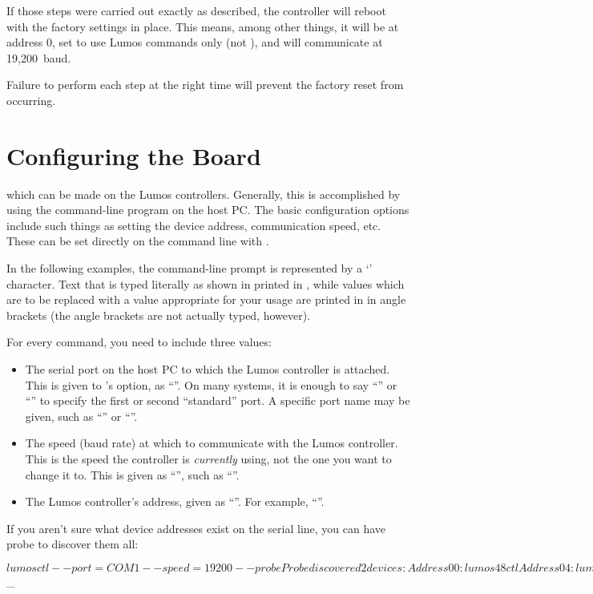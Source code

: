 \documentclass[letterpaper,twoside,onecolumn,openright,final]{memoir}
\begin{document}
If those steps were carried out exactly as described, %
the controller will reboot with the factory settings in place.  This means, among other things,
it will be at address 0, set to use Lumos commands only (not ), and will communicate
at 19,200~baud.

Failure to perform each step at the right time will prevent the factory reset from occurring.

\chapter{Configuring the Board}
 which can be made on the Lumos controllers.  Generally,
this is accomplished by using the  com\-mand-line program on the host PC.  The basic configuration
options include such things as setting the device address, communication speed, etc.  These can be set
directly on the command line with .

In the following examples, the command-line prompt is represented by a `\z{\$}' character.
Text that is typed literally as shown in printed in , while values which are
to be replaced with a value appropriate for your usage are printed in  in angle brackets
(the angle brackets are not actually typed, however).

For every command, you need to include three values:
\begin{itemize}
	\item 	The serial port on the host PC to which the Lumos controller is attached.  This is
		given to 's  option, as ``''.  On many
		systems, it is enough to say ``'' or ``'' to specify the first
		or second ``standard'' port.  A specific port name may be given, such as 
		``'' or ``''.
	\item	The speed (baud rate) at which to communicate with the Lumos controller.  This is
		the speed the controller is \emph{currently} using, not the one you want to change it
		to.  This is given as ``'', such as ``''.
	\item	The Lumos controller's address, given as ``''.  For example,
		``''.
\end{itemize}

If you aren't sure what device addresses exist on the serial line, you can have  
probe to discover them all:
\begin{SourceCode}
$ lumosctl --port=COM1 --speed=19200 --probe
Probe discovered 2 devices:
Address 00: lumos48ctl
Address 04: lumos24dc
$ _
\end{SourceCode}
\end{document}
